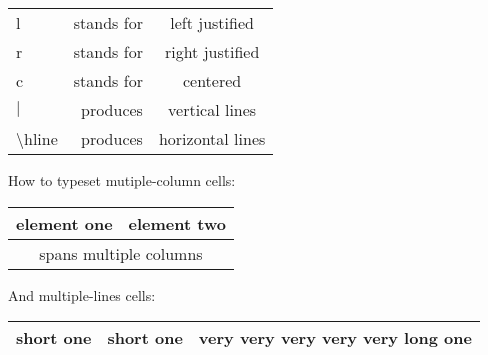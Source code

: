 \begin{tabular}{|l|r|c|}
l & stands for & left justified \\
r & stands for & right justified \\
c & stands for & centered \\
$\vert$ & produces & vertical lines\\
\hline
\textbackslash hline & produces & horizontal lines
\end{tabular}
\vspace{24pt}

How to typeset mutiple-column cells:

\vspace{0.1cm}
\begin{tabular}{|c|c|}
\hline
  element one & element two \\
\hline
  \multicolumn{2}{|c|}{spans multiple columns}\\
\hline
\end{tabular}

\vspace{0.1in}
And multiple-lines cells:

\begin{tabular}{|c|c|p{3cm}|}
\hline
short one & short one & very very very very very long one\\
\hline
\end{tabular}
\vspace{0.5cm}
